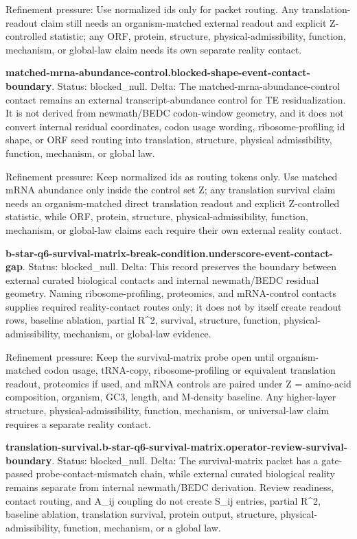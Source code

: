Refinement pressure: Use normalized ids only for packet routing. Any translation-readout claim still needs an organism-matched external readout and explicit Z-controlled statistic; any ORF, protein, structure, physical-admissibility, function, mechanism, or global-law claim needs its own separate reality contact.

\textbf{matched-mrna-abundance-control.blocked-shape-event-contact-boundary}. Status: blocked\_null. Delta: The matched-mrna-abundance-control contact remains an external transcript-abundance control for TE residualization. It is not derived from newmath/BEDC codon-window geometry, and it does not convert internal residual coordinates, codon usage wording, ribosome-profiling id shape, or ORF seed routing into translation, structure, physical admissibility, function, mechanism, or global law.

Refinement pressure: Keep normalized ids as routing tokens only. Use matched mRNA abundance only inside the control set Z; any translation survival claim needs an organism-matched direct translation readout and explicit Z-controlled statistic, while ORF, protein, structure, physical-admissibility, function, mechanism, or global-law claims each require their own external reality contact.

\textbf{b-star-q6-survival-matrix-break-condition.underscore-event-contact-gap}. Status: blocked\_null. Delta: This record preserves the boundary between external curated biological contacts and internal newmath/BEDC residual geometry. Naming ribosome-profiling, proteomics, and mRNA-control contacts supplies required reality-contact routes only; it does not by itself create readout rows, baseline ablation, partial R\textasciicircum{}2, survival, structure, function, physical-admissibility, mechanism, or global-law evidence.

Refinement pressure: Keep the survival-matrix probe open until organism-matched codon usage, tRNA-copy, ribosome-profiling or equivalent translation readout, proteomics if used, and mRNA controls are paired under Z = amino-acid composition, organism, GC3, length, and M-density baseline. Any higher-layer structure, physical-admissibility, function, mechanism, or universal-law claim requires a separate reality contact.

\textbf{translation-survival.b-star-q6-survival-matrix.operator-review-survival-boundary}. Status: blocked\_null. Delta: The survival-matrix packet has a gate-passed probe-contact-mismatch chain, while external curated biological reality remains separate from internal newmath/BEDC derivation. Review readiness, contact routing, and A\_ij coupling do not create S\_ij entries, partial R\textasciicircum{}2, baseline ablation, translation survival, protein output, structure, physical-admissibility, function, mechanism, or a global law.

